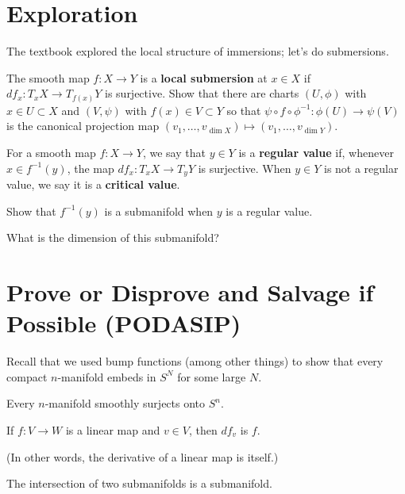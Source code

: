 \documentclass{homework}
\begin{document}
\section{Exploration}

\begin{problem}
  The textbook explored the local structure of immersions; let's do submersions.
  
  The smooth map $f : X \to Y$ is a \textbf{local submersion} at
  $x \in X$ if $df_x : T_x X \to T_{f(x)} Y$ is surjective.  Show that
  there are charts $(U,\phi)$ with $x \in U \subset X$ and $(V,\psi)$
  with $f(x) \in V \subset Y$ so that
  $\psi \circ f \circ \phi^{-1} : \phi(U) \to \psi(V)$ is the
  canonical projection map
  $(v_1,\ldots,v_{\dim X}) \mapsto (v_1,\ldots,v_{\dim Y})$.
\end{problem}

\begin{problem}
  For a smooth map $f : X \to Y$, we say that $y \in Y$ is a
  \textbf{regular value} if, whenever $x \in f^{-1}(y)$, the map
  $df_x : T_x X \to T_y Y$ is surjective.  When $y \in Y$ is not a
  regular value, we say it is a \textbf{critical value}.

  Show that $f^{-1}(y)$ is a submanifold when $y$ is a regular value.

  What is the dimension of this submanifold?
\end{problem}


\section{Prove or Disprove and Salvage if Possible (PODASIP)}

Recall that we used bump functions (among other things) to show that
every compact $n$-manifold embeds in $S^N$ for some large $N$.

\begin{problem}\label{degree-one-to-sphere}
  Every $n$-manifold smoothly surjects onto $S^n$.
\end{problem}

\begin{problem}
  If $f : V \to W$ is a linear map and $v \in V$, then $df_v$ is $f$.

  (In other words, the derivative of a linear map is itself.)
\end{problem}

\begin{problem}
  The intersection of two submanifolds is a submanifold.
\end{problem}
\end{document}
